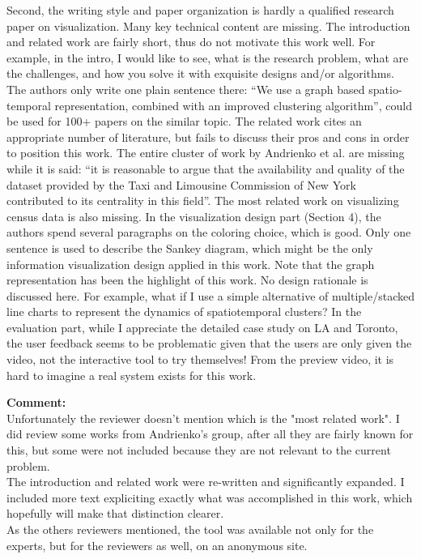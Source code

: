 \documentclass{article}
\newcommand{\reply}[1]{\begin{tcolorbox}\noindent\textbf{Comment:}\\#1\hfill\end{tcolorbox}}
\begin{document}
\begin{itemize}
{{    Second, the writing style and paper organization is hardly a qualified
    research paper on visualization. Many key technical content are missing. The
    introduction and related work are fairly short, thus do not motivate this
    work well. For example, in the intro, I would like to see, what is the
    research problem, what are the challenges, and how you solve it with
    exquisite designs and/or algorithms. The authors only write one plain
    sentence there: ``We use a graph based spatio- temporal representation,
    combined with an improved clustering algorithm'', could be used for 100+
    papers on the similar topic. The related work cites an appropriate number of
    literature, but fails to discuss their pros and cons in order to position
    this work. The entire cluster of work by Andrienko et al. are missing while
    it is said: ``it is reasonable to argue that the availability and quality of
    the dataset provided by the Taxi and Limousine Commission of New York
    contributed to its centrality in this field''. The most related work on
    visualizing census data is also missing. In the visualization design part
    (Section 4), the authors spend several paragraphs on the coloring choice,
    which is good. Only one sentence is used to describe the Sankey diagram,
    which might be the only information visualization design applied in this
    work. Note that the graph representation has been the highlight of this
    work. No design rationale is discussed here. For example, what if I use a
    simple alternative of multiple/stacked line charts to represent the dynamics
    of spatiotemporal clusters? In the evaluation part, while I appreciate the
    detailed case study on LA and Toronto, the user feedback seems to be
    problematic given that the users are only given the video, not the
    interactive tool to try themselves! From the preview video, it is hard to
    imagine a real system exists for this work.


    \reply{Unfortunately the reviewer doesn't mention which is the "most related
    work". I did review some works from Andrienko's group, after all they are
    fairly known for this, but some were not included because they are not
    relevant to the current problem. \\The introduction and related work were
    re-written and significantly expanded. I included more text expliciting
    exactly what was accomplished in this work, which hopefully will make that
    distinction clearer. \\ As the others reviewers mentioned, the tool was
    available not only for the experts, but for the reviewers as well, on an
    anonymous site.}

}}
\end{itemize}
\end{document}
